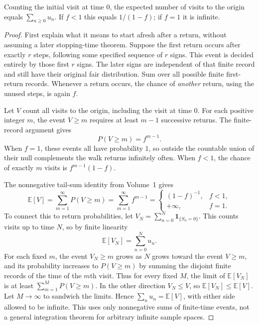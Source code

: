 \begin{proposition}\label{prop:visits}
Counting the initial visit at time $0$, the expected number of visits to the origin equals $\sum_{n\ge0}u_n$. If $f<1$ this equals $1/(1-f)$; if $f=1$ it is infinite.
\end{proposition}
\begin{proof}
First explain what it means to start afresh after a return, without assuming a later stopping-time theorem. Suppose the first return occurs after exactly $r$ steps, following some specified sequence of $r$ signs. This event is decided entirely by those first $r$ signs. The later signs are independent of that finite record and still have their original fair distribution. Sum over all possible finite first-return records. Whenever a return occurs, the chance of \emph{another} return, using the unused steps, is again $f$.

Let $V$ count all visits to the origin, including the visit at time $0$. For each positive integer $m$, the event $V\ge m$ requires at least $m-1$ successive returns. The finite-record argument gives
\[
 P(V\ge m)=f^{m-1}.
\]
When $f=1$, these events all have probability $1$, so outside the countable union of their null complements the walk returns infinitely often. When $f<1$, the chance of exactly $m$ visits is $f^{m-1}(1-f)$.

The nonnegative tail-sum identity from Volume~1 gives
\[
 \mathbb E[V]=\sum_{m=1}^\infty P(V\ge m)
 =\sum_{m=1}^\infty f^{m-1}
 =\begin{cases}(1-f)^{-1},&f<1,\\+\infty,&f=1.\end{cases}
\]
To connect this to return probabilities, let $V_N=\sum_{n=0}^N\mathbf 1_{\{S_n=0\}}$. This counts visits up to time $N$, so by finite linearity
\[
 \mathbb E[V_N]=\sum_{n=0}^N u_n.
\]
For each fixed $m$, the event $V_N\ge m$ grows as $N$ grows toward the event $V\ge m$, and its probability increases to $P(V\ge m)$ by summing the disjoint finite records of the time of the $m$th visit. Thus for every fixed $M$, the limit of $\mathbb E[V_N]$ is at least $\sum_{m=1}^M P(V\ge m)$. In the other direction $V_N\le V$, so $\mathbb E[V_N]\le\mathbb E[V]$. Let $M\to\infty$ to sandwich the limits. Hence $\sum_nu_n=\mathbb E[V]$, with either side allowed to be infinite. This uses only nonnegative sums of finite-time events, not a general integration theorem for arbitrary infinite sample spaces.
\end{proof}

